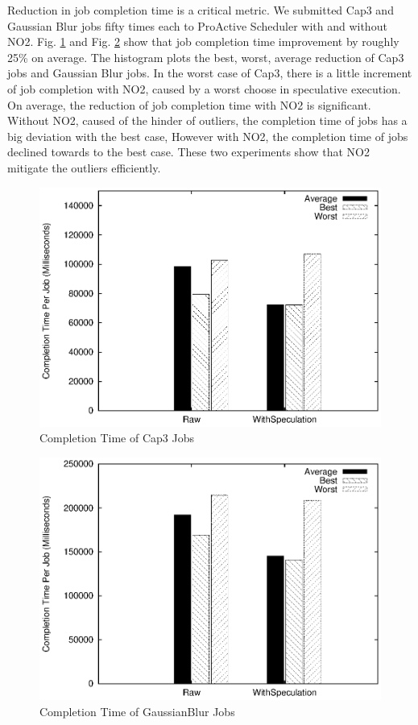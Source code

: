 Reduction in job completion time is a critical metric. We submitted Cap3 and Gaussian Blur jobs fifty times each to ProActive Scheduler with and without NO2. Fig. \ref{figure:completiontime_cap3} and Fig. \ref{figure:completiontime_gaussianblur} show that job completion time improvement by roughly 25\% on average. The histogram plots the best, worst, average reduction of Cap3 jobs and Gaussian Blur jobs. In the worst case of Cap3, there is a little increment of job completion with NO2, caused by a worst choose in speculative execution. On average, the reduction of job completion time with NO2 is significant. Without NO2, caused of the hinder of outliers, the completion time of jobs has a big deviation with the best case, However with NO2, the completion time of jobs declined towards to the best case. These two experiments show that NO2 mitigate the outliers efficiently.

\begin{figure}
\centering
\includegraphics[width=0.9\columnwidth]{figures/completiontime_cap3.eps}
\caption{Completion Time of Cap3 Jobs}
\label{figure:completiontime_cap3}
\end{figure}

\begin{figure}
\centering
\includegraphics[width=0.9\columnwidth]{figures/completiontime_gaussianblur.eps}
\caption{Completion Time of GaussianBlur Jobs}
\label{figure:completiontime_gaussianblur}
\end{figure}

